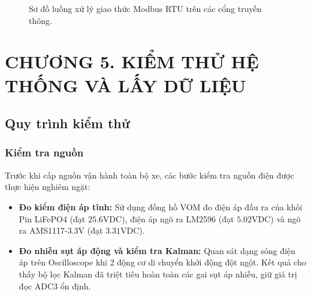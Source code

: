 \documentclass{article}
\begin{document}
\begin{figure}[H]
\centering
{}
\caption{Sơ đồ luồng xử lý giao thức Modbus RTU trên các cổng truyền thông.}
\label{fig:seq_modbus}
\end{figure}



\clearpage

\section*{CHƯƠNG 5. KIỂM THỬ HỆ THỐNG VÀ LẤY DỮ LIỆU}
\setcounter{section}{5}
\setcounter{subsection}{0}
\setcounter{figure}{0}
\setcounter{table}{0}

\subsection{Quy trình kiểm thử}

\subsubsection{Kiểm tra nguồn}
Trước khi cấp nguồn vận hành toàn bộ xe, các bước kiểm tra nguồn điện được thực hiện nghiêm ngặt:
\begin{itemize}
    \item \textbf{Đo kiểm điện áp tĩnh:} Sử dụng đồng hồ VOM đo điện áp đầu ra của khối Pin LiFePO4 (đạt $25.6\text{VDC}$), điện áp ngõ ra LM2596 (đạt $5.02\text{VDC}$) và ngõ ra AMS1117-3.3V (đạt $3.31\text{VDC}$).
    \item \textbf{Đo nhiễu sụt áp động và kiểm tra Kalman:} Quan sát dạng sóng điện áp trên Oscilloscope khi 2 động cơ di chuyển khởi động đột ngột. Kết quả cho thấy bộ lọc Kalman đã triệt tiêu hoàn toàn các gai sụt áp nhiễu, giữ giá trị đọc ADC3 ổn định.
\end{itemize}
\end{document}
